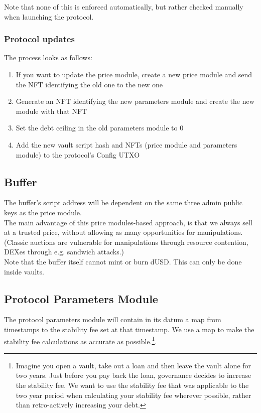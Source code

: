 \documentclass{article} %
\begin{document}
Note that none of this is enforced automatically, but rather checked manually
when launching the protocol.

\subsubsection*{Protocol updates}

The process looks as follows:
\begin{enumerate}
  \item If you want to update the price module, create a new price module and
    send the NFT identifying the old one to the new one
  \item Generate an NFT identifying the new parameters module and create the new
    module with that NFT
  \item Set the debt ceiling in the old parameters module to $0$
  \item Add the new vault script hash and NFTs (price module and parameters
    module) to the protocol's Config UTXO
\end{enumerate}


\subsection{Buffer}

The buffer's script address will be dependent on the same three admin public
keys as the price module. \\

The main advantage of this price modules-based approach, is that we always sell
at a trusted price, without allowing as many opportunities for manipulations.
(Classic auctions are vulnerable for manipulations through resource contention,
DEXes through e.g. sandwich attacks.) \\

Note that the buffer itself cannot mint or burn dUSD. This can only be done
inside vaults.

\subsection{Protocol Parameters Module}

The protocol parameters module will contain in its datum a map from timestamps
to the stability fee set at that timestamp.
We use a map to make the stability fee calculations as accurate as
possible.\footnote{
  Imagine you open a vault, take out a loan and then leave the vault alone for
  two years.
  Just before you pay back the loan, governance decides to increase the
  stability fee.
  We want to use the stability fee that was applicable to the two year period
  when calculating your stability fee wherever possible, rather than
  retro-actively increasing your debt.
}. \\
\end{document}
